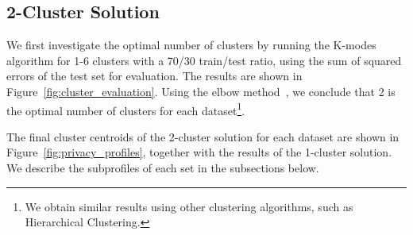 \subsection{2-Cluster Solution}

We first investigate the optimal number of clusters by running the K-modes algorithm for 1-6 clusters with a 70/30 train/test ratio, using the sum of squared errors of the test set for evaluation. The results are shown in Figure~\ref{fig:cluster_evaluation}. Using the elbow method~\cite{kodinariya2013review}, we conclude that 2 is the optimal number of clusters for each dataset\footnote{We obtain similar results using other clustering algorithms, such as Hierarchical Clustering.}. 



The final cluster centroids of the 2-cluster solution for each dataset are shown in Figure~\ref{fig:privacy_profiles}, together with the results of the 1-cluster solution. %
We describe the subprofiles of each set in the subsections below.

